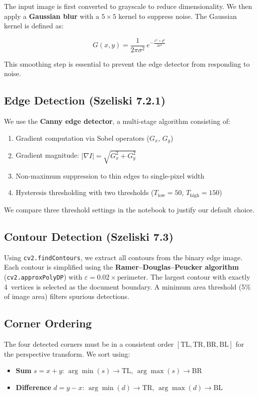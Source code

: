 \documentclass[11pt,a4paper]{article}
\begin{document}
The input image is first converted to grayscale to reduce dimensionality. We then apply a \textbf{Gaussian blur} with a $5 \times 5$ kernel to suppress noise. The Gaussian kernel is defined as:

\begin{equation}
G(x, y) = \frac{1}{2\pi\sigma^2} \, e^{-\frac{x^2 + y^2}{2\sigma^2}}
\end{equation}

This smoothing step is essential to prevent the edge detector from responding to noise.

\subsection{Edge Detection (Szeliski 7.2.1)}

We use the \textbf{Canny edge detector}, a multi-stage algorithm consisting of:
\begin{enumerate}[nosep]
    \item Gradient computation via Sobel operators ($G_x$, $G_y$)
    \item Gradient magnitude: $|\nabla I| = \sqrt{G_x^2 + G_y^2}$
    \item Non-maximum suppression to thin edges to single-pixel width
    \item Hysteresis thresholding with two thresholds ($T_{\text{low}}=50$, $T_{\text{high}}=150$)
\end{enumerate}

We compare three threshold settings in the notebook to justify our default choice.

\subsection{Contour Detection (Szeliski 7.3)}

Using \texttt{cv2.findContours}, we extract all contours from the binary edge image. Each contour is simplified using the \textbf{Ramer--Douglas--Peucker algorithm} (\texttt{cv2.approxPolyDP}) with $\varepsilon = 0.02 \times \text{perimeter}$. The largest contour with exactly 4~vertices is selected as the document boundary. A minimum area threshold (5\% of image area) filters spurious detections.

\subsection{Corner Ordering}

The four detected corners must be in a consistent order $[\text{TL}, \text{TR}, \text{BR}, \text{BL}]$ for the perspective transform. We sort using:
\begin{itemize}[nosep]
    \item \textbf{Sum} $s = x + y$: $\arg\min(s) \to \text{TL}$, $\arg\max(s) \to \text{BR}$
    \item \textbf{Difference} $d = y - x$: $\arg\min(d) \to \text{TR}$, $\arg\max(d) \to \text{BL}$
\end{itemize}
\end{document}
